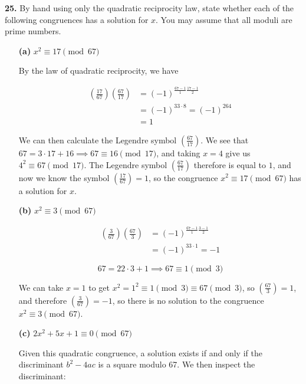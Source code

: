\documentclass[12pt]{amsart}
\begin{document}
\medskip

{\bf 25.}   By hand using only the quadratic reciprocity law, state whether each of the following congruences has a solution for $x$.  You may assume that all moduli are prime numbers.
\begin{itemize}
\item[{\bf (a)}]  $x^2\equiv17\pmod{67}$ 

\medskip

By the law of quadratic reciprocity, we have

\[
\begin{split}
\left(\frac{17}{67} \right)\left(\frac{67}{17} \right) &= (-1)^{\frac{67-1}{1}\frac{17-1}{2}} \\
&= (-1)^{33\cdot 8} = (-1)^{264} \\
&= 1
\end{split}
\]

We can then calculate the Legendre symbol $(\frac{67}{17})$. We see that $67 = 3\cdot 17 + 16 \implies 67 \equiv 16\pmod{17}$, and taking $x=4$ give us $4^2 \equiv 67 \pmod{17}$. The Legendre symbol $(\frac{67}{17})$ therefore is equal to $1$, and now we know the symbol $(\frac{17}{67}) = 1$, so the congruence $x^2 \equiv 17\pmod{67}$ has a solution for $x$.

\medskip

\item[{\bf (b)}]  $x^2\equiv3\pmod{67}$ 

\medskip

\[
\begin{split}
\left(\frac{3}{67} \right)\left(\frac{67}{3} \right) &= (-1)^{\frac{67-1}{1}\frac{3-1}{2}} \\
&= (-1)^{33\cdot 1} = -1 
\end{split}
\]

\[
67 = 22 \cdot 3 + 1 \implies 67\equiv 1\pmod{3} 
\]

We can take $x=1$ to get $x^2=1^2\equiv 1\pmod{3}\equiv 67\pmod{3}$, so $(\frac{67}{3})=1$, and therefore $(\frac{3}{67})=-1$, so there is no solution to the congruence $x^2\equiv 3\pmod{67}$.	

\medskip

\item[{\bf (c)}]  $2x^2+5x+1\equiv0\pmod{67}$ 

\medskip

Given this quadratic congruence, a solution exists if and only if the discriminant $b^2-4ac$ is a square modulo 67. We then inspect the discriminant:


\end{itemize}
\end{document}
